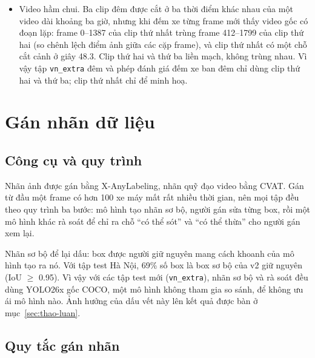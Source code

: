 \begin{itemize}
        xe có thể bị sót, đề tài dùng mô hình YOLO26x gốc COCO, không phải mô hình của đề tài; mô hình này cũng đề xuất
        box cho 8 xe ở làn bên kia dải phân cách mà nhãn còn thiếu, và từng box được duyệt bằng mắt. Mọi chỉnh sửa được
        ghi lại kèm bản sao lưu.
  \item Video hầm chui. Ba clip đêm được cắt ở ba thời điểm khác nhau của một video dài khoảng ba giờ, nhưng
        khi đếm xe từng frame mới thấy video gốc có đoạn lặp: frame 0--1387 của clip thứ nhất trùng frame 412--1799 của
        clip thứ hai (so chênh lệch điểm ảnh giữa các cặp frame), và clip thứ nhất có một chỗ cắt cảnh ở giây 48.3. Clip
        thứ hai và thứ ba liền mạch, không trùng nhau. Vì vậy tập \texttt{vn\_extra} đêm và phép đánh giá đếm xe ban đêm
        chỉ dùng clip thứ hai và thứ ba; clip thứ nhất chỉ để minh hoạ.
\end{itemize}

\section{Gán nhãn dữ liệu}

\subsection{Công cụ và quy trình}

Nhãn ảnh được gán bằng X-AnyLabeling, nhãn quỹ đạo video bằng CVAT. Gán từ đầu một frame có hơn 100 xe máy mất rất
nhiều thời gian, nên mọi tập đều theo quy trình ba bước: mô hình tạo nhãn sơ bộ, người gán sửa từng box, rồi một mô hình
khác rà soát để chỉ ra chỗ ``có thể sót'' và ``có thể thừa'' cho người gán xem lại.

Nhãn sơ bộ để lại dấu: box được người giữ nguyên mang cách khoanh của mô hình tạo ra nó. Với tập test Hà Nội, 69\% số
box là box sơ bộ của v2 giữ nguyên (IoU $\ge$ 0.95). Vì vậy với các tập test mới (\texttt{vn\_extra}), nhãn sơ bộ và rà
soát đều dùng YOLO26x gốc COCO, một mô hình không tham gia so sánh, để không ưu ái mô hình nào. Ảnh hưởng của dấu vết
này lên kết quả được bàn ở mục~\ref{sec:thao-luan}.

\subsection{Quy tắc gán nhãn}

